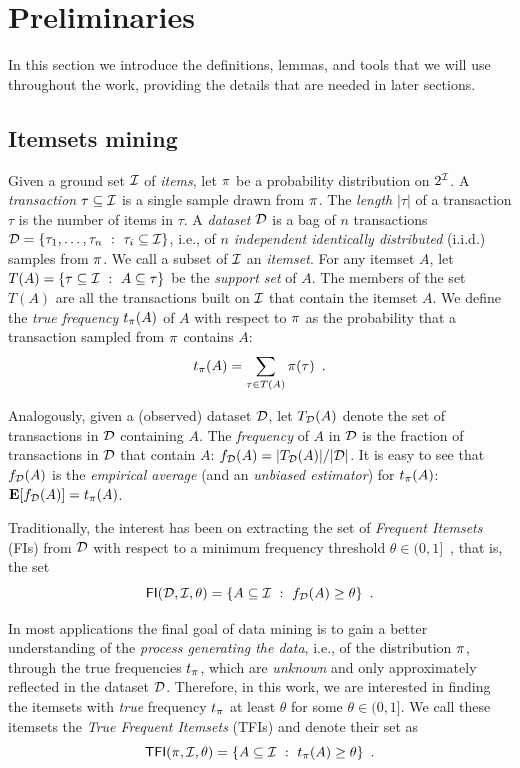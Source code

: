 \section{Preliminaries}\label{sec:prelims}
In this section we introduce the definitions, lemmas, and tools that we will use
throughout the work, providing the details that are needed in later sections.

\subsection{Itemsets mining}\label{sec:itemdef}
Given a ground set ${\cal I}$ of \emph{items}, let $\pi$ be a probability
distribution on $2^{{\cal I}}$. A \emph{transaction} $\tau\subseteq{\cal I}$ is a single
sample drawn from $\pi$. The \emph{length} $|\tau|$ of a transaction $\tau$ is
the number of items in $\tau$.  A \emph{dataset} ${\cal D}$ is a bag of $n$
transactions ${\cal D}=\{\tau_1,\dots,\tau_n ~:~ \tau_i\subseteq{\cal I}\}$, i.e., of $n$
\emph{independent identically distributed} (i.i.d.) samples from $\pi$. We
call a subset of ${\cal I}$ an \emph{itemset}. For any itemset $A$, let
$T(A)=\{\tau\subseteq{\cal I} ~:~ A\subseteq \tau\}$ be the \emph{support set} of
$A$. The members of the set $T(A)$ are all the transactions built on ${\cal I}$
that contain the itemset $A$. We define the \emph{true frequency} $t_\pi(A)$ of
$A$ with respect to $\pi$ as the probability that a transaction sampled from
$\pi$ contains $A$:
\[
t_\pi(A) = \sum_{\tau\in T(A)}\pi(\tau)\enspace.
\]

Analogously, given a (observed) dataset ${\cal D}$, let $T_{\cal D}(A)$ denote the set of
transactions in ${\cal D}$ containing $A$. The \emph{frequency} of $A$ in ${\cal D}$ is
the fraction of transactions in ${\cal D}$ that contain $A$: $f_{\cal D}(A)=
|T_{\cal D}(A)|/|{\cal D}|$. It is easy to see that $f_{\cal D}(A)$ is the \emph{empirical
average} (and an \emph{unbiased estimator}) for $t_\pi(A)$: ${\mathbf
E}[f_{\cal D}(A)]=t_\pi(A)$.

Traditionally, the interest has been on extracting the set of \emph{Frequent
Itemsets} (FIs) from ${\cal D}$ with respect to a minimum frequency threshold
$\theta\in(0,1]$~\citep{AgrawalIS93}, that is, the set
\[
\mathsf{FI}({\cal D},{\cal I},\theta)=\{A\subseteq{\cal I} ~:~ f_{\cal D}(A)\ge\theta\}\enspace.\]

In most applications the final goal of data mining is to gain a better
understanding of the \emph{process generating the data}, i.e., of the
distribution $\pi$, through the true frequencies $t_\pi$, which are
\emph{unknown} and only approximately reflected in the dataset ${\cal D}$. Therefore,
in this work, we are interested in finding the itemsets with \emph{true}
frequency $t_\pi$ at least $\theta$ for some $\theta\in(0,1]$. We call these
itemsets the \emph{True Frequent Itemsets} (TFIs) and denote their set as
\[
\mathsf{TFI}(\pi,{\cal I},\theta)=\{A\subseteq{\cal I} ~:~ t_\pi(A)\ge\theta\}\enspace.\]

